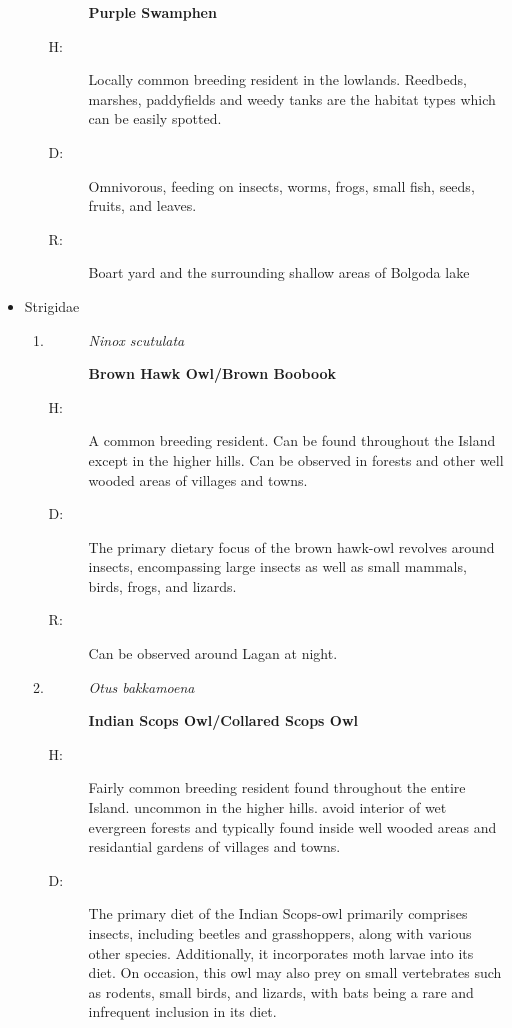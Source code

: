 \begin{itemize}
\begin{enumerate}
\begin{description}
\item[]%
\textbf{Purple Swamphen}%
\end{description}%
\begin{description}%
\item[H: ]%
Locally common breeding resident in the lowlands. Reedbeds, marshes, paddyfields and weedy tanks are the habitat types which can be easily spotted.%
\item[D: ]%
 Omnivorous, feeding on insects, worms, frogs, small fish, seeds, fruits, and leaves.%
\item[R: ]%
Boart yard and the surrounding shallow areas of Bolgoda lake%
\end{description}%
\end{enumerate}%
\item%
Strigidae%
\begin{enumerate}%
\item%
\begin{description}%
\item[]%
\textit{Ninox scutulata}%
\item[]%
\textbf{Brown Hawk Owl/Brown Boobook}%
\end{description}%
\begin{description}%
\item[H: ]%
A common breeding resident. Can be found throughout the Island except in the higher hills. Can be observed in forests and other well wooded areas of villages and towns. %
\item[D: ]%
The primary dietary focus of the brown hawk{-}owl revolves around insects, encompassing large insects as well as small mammals, birds, frogs, and lizards.%
\item[R: ]%
Can be observed around Lagan at night.%
\end{description}%
\item%
\begin{description}%
\item[]%
\textit{Otus bakkamoena}%
\item[]%
\textbf{Indian Scops Owl/Collared Scops Owl}%
\end{description}%
\begin{description}%
\item[H: ]%
Fairly common breeding resident found throughout the entire Island. uncommon in the higher hills. avoid interior of wet evergreen forests and typically found inside well wooded areas and residantial gardens of villages and towns.%
\item[D: ]%
The primary diet of the Indian Scops{-}owl primarily comprises insects, including beetles and grasshoppers, along with various other species. Additionally, it incorporates moth larvae into its diet. On occasion, this owl may also prey on small vertebrates such as rodents, small birds, and lizards, with bats being a rare and infrequent inclusion in its diet.%

\end{description}
\end{enumerate}
\end{itemize}
